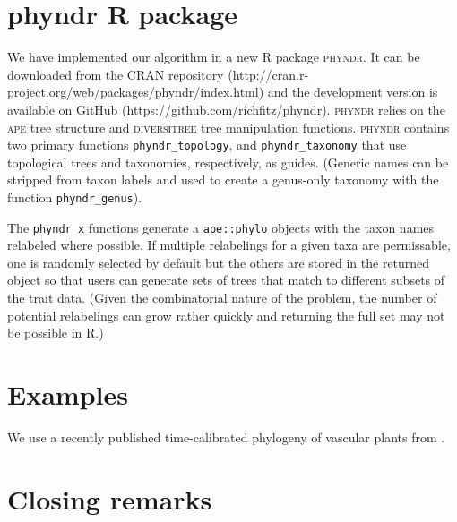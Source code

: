 \documentclass[a4paper,11pt]{article}
\begin{document}
\section{phyndr R package}

We have implemented our algorithm in a new R package \textsc{phyndr}. It can be downloaded from the CRAN repository (\url{http://cran.r-project.org/web/packages/phyndr/index.html}) and the development version is available on GitHub (\url{https://github.com/richfitz/phyndr}). \textsc{phyndr} relies on the \textsc{ape} \citep{ape} tree structure and \textsc{diversitree} \citep{FitzJohn2012} tree manipulation functions. \textsc{phyndr} contains two primary functions \texttt{phyndr\_topology}, and \texttt{phyndr\_taxonomy} that use topological trees and taxonomies, respectively, as guides. (Generic names can be stripped from taxon labels and used to create a genus-only taxonomy with the function \texttt{phyndr\_genus}). 

The \texttt{phyndr\_x} functions generate a \texttt{ape::phylo} objects with the taxon names relabeled where possible. If multiple relabelings for a given taxa are permissable, one is randomly selected by default but the others are stored in the returned object so that users can generate sets of trees that match to different subsets of the trait data. (Given the combinatorial nature of the problem, the number of potential relabelings can grow rather quickly and returning the full set may not be possible in R.)  

\section{Examples}

We use a recently published time-calibrated phylogeny of vascular plants from \citet{Magallon2015}. 

\section{Closing remarks}
\end{document}
